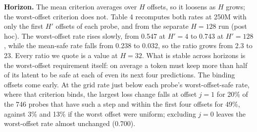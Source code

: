 \documentclass[11pt]{article}
\begin{document}
\begin{table}[t]
\centering
\caption{Mean suffix-safe rate (fraction of $d_c$) under the mean ($k=32$) and worst-offset ($k=1$) criteria at four budgets, recomputed from stored per-offset records on the published grid (smallest rate 0.031). Ratio is max over mean; because most mean-criterion rates sit at the grid floor, each ratio is a lower bound.}
\end{table}

\textbf{Horizon.} The mean criterion averages over $H$ offsets, so it loosens as $H$ grows; the worst-offset criterion does not. Table 4 recomputes both rates at 250M with only the first $H'$ offsets of each probe, and from the separate $H=128$ run (post hoc). The worst-offset rate rises slowly, from 0.547 at $H'=4$ to 0.743 at $H'=128$, while the mean-safe rate falls from 0.238 to 0.032, so the ratio grows from 2.3 to 23. Every ratio we quote is a value at $H=32$. What is stable across horizons is the worst-offset requirement itself: on average a token must keep more than half of its latent to be safe at each of even its next four predictions. The binding offsets come early. At the grid rate just below each probe's worst-offset-safe rate, where that criterion binds, the largest loss change falls at offset $j=1$ for 20\% of the 746 probes that have such a step and within the first four offsets for 49\%, against 3\% and 13\% if the worst offset were uniform; excluding $j=0$ leaves the worst-offset rate almost unchanged (0.700).
\end{document}
